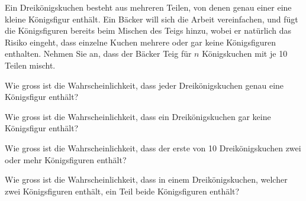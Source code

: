 Ein Dreikönigskuchen besteht aus mehreren Teilen, von denen genau einer 
eine kleine
Königsfigur enthält. Ein Bäcker will sich die Arbeit vereinfachen, und
fügt die Königsfiguren bereits beim Mischen des Teigs hinzu,
wobei er natürlich das Risiko eingeht, dass einzelne Kuchen mehrere oder
gar keine Königsfiguren enthalten. Nehmen Sie an, dass der Bäcker Teig
für $n$ Königskuchen mit je 10 Teilen mischt.
\begin{teilaufgaben}
\item Wie gross ist die Wahrscheinlichkeit, dass jeder Dreikönigskuchen genau
eine Königsfigur enthält?
\item Wie gross ist die Wahrscheinlichkeit, dass ein Dreikönigskuchen gar
keine Königsfigur enthält?
\item Wie gross ist die Wahrscheinlichkeit, dass der erste von
10 Dreikönigskuchen zwei oder mehr Königsfiguren enthält?
\item Wie gross ist die Wahrscheinlichkeit, dass in einem Dreikönigskuchen,
welcher zwei Königsfiguren enthält, ein Teil
beide Königsfiguren enthält?
\end{teilaufgaben}


